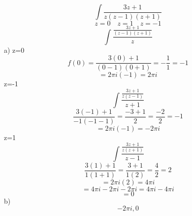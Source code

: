 \documentclass{article}
\begin{document}
\begin{equation}
\int \frac{3z+1}{z(z-1)(z+1)}
\end{equation}
\begin{equation}
z=0 \quad z=1 \quad z=-1
\end{equation}
\begin{equation}
\int \frac{\frac{3z+1}{(z-1)(z+1)}}{z}
\end{equation}
a) z=0
\begin{equation}
f(0)=\frac{3(0)+1}{(0-1)(0+1)}=-\frac{1}{1}=-1
\end{equation}
\begin{equation}
=2\pi i(-1)= 2\pi i
\end{equation}
z=-1
\begin{equation}
\int \frac{\frac{3z+1}{z(z-1)}}{z+1}
\end{equation}
\begin{equation}
\frac{3(-1)+1}{-1(-1-1)}=\frac{-3+1}{2}=\frac{-2}{2}=-1
\end{equation}
\begin{equation}
=2\pi i(-1)= -2\pi i
\end{equation}
z=1
\begin{equation}
\int \frac{\frac{3z+1}{z(z+1)}}{z-1}
\end{equation}
\begin{equation}
\frac{3(1)+1}{1(1+1)}=\frac{3+1}{1(2)}=\frac{4}{2}=2
\end{equation}
\begin{equation}
=2\pi i (2)= 4\pi i
\end{equation}
\begin{equation}
=4\pi i -2\pi i -2 \pi i= 4\pi i -4 \pi i
\end{equation}
\begin{equation}
=0
\end{equation}
b)
\begin{equation}
-2 \pi i,0
\end{equation}
\end{document}
